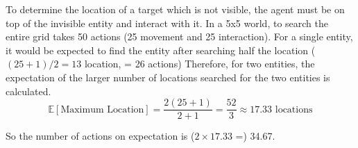 \label{sec:num-actions}


To determine the location of a target which is not visible, the agent must be on top of the invisible entity and interact with it.
In a 5x5 world, to search the entire grid takes 50 actions (25 movement and 25 interaction).
For a single entity, it would be expected to find the entity after searching half the location ($(25+1)/2=13$ location, = 26 actions)
Therefore, for two entities, the expectation of the larger number of locations searched for the two entities is calculated.
\begin{equation}
    \mathbb{E}[\text{Maximum Location}] = \frac{2(25+1)}{2 + 1} = \frac{52}{3} \approx 17.33 \text{ locations}
\end{equation}

So the number of actions on expectation is ($2 \times 17.33$ =) 34.67.